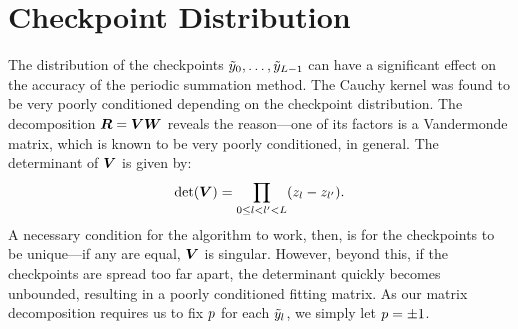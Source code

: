 \section{Checkpoint Distribution}

The distribution of the checkpoints
${\tilde{y}}_0, \hdots, {\tilde{y}}_{L-1}$ can have a significant
effect on the accuracy of the periodic summation method. The Cauchy
kernel was found to be very poorly conditioned depending on the
checkpoint distribution. The decomposition
$\boldsymbol{R} = \boldsymbol{V}\boldsymbol{W}$ reveals the reason---one of its
factors is a Vandermonde matrix, which is known to be very poorly
conditioned, in general. The determinant of $\boldsymbol{V}$ is given
by:
\begin{align}
  \det(\boldsymbol{V}) = \prod_{0 \leq l < l' < L} (z_l - z_{l'}).
\end{align}
A necessary condition for the algorithm to work, then, is for the
checkpoints to be unique---if any are equal, $\boldsymbol{V}$ is
singular. However, beyond this, if the checkpoints are spread too far
apart, the determinant quickly becomes unbounded, resulting in a
poorly conditioned fitting matrix. As our matrix decomposition
requires us to fix $p$ for each ${\tilde{y}}_l$, we simply let
$p = \pm 1$.


